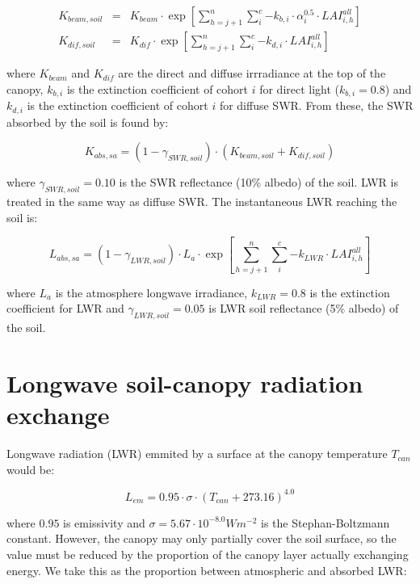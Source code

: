 \documentclass[]{book}
\begin{document}
\begin{eqnarray}
K_{beam, soil} &=&  K_{beam} \cdot \exp\left[ \sum_{h=j+1}^{n}{\sum_{i}^{c}{-k_{b,i}\cdot \alpha_i^{0.5} \cdot LAI^{all}_{i,h}}}\right]\\
K_{dif, soil} &=& K_{dif} \cdot \exp\left[ \sum_{h=j+1}^{n}{\sum_{i}^{c}{-k_{d,i}\cdot LAI^{all}_{i,h}}}\right]
\end{eqnarray}

where \(K_{beam}\) and \(K_{dif}\) are the direct and diffuse
irrradiance at the top of the canopy, \(k_{b,i}\) is the extinction
coefficient of cohort \(i\) for direct light (\(k_{b,i} = 0.8\)) and
\(k_{d,i}\) is the extinction coefficient of cohort \(i\) for diffuse
SWR. From these, the SWR absorbed by the soil is found by:

\begin{equation}
K_{abs,sa} = (1 - \gamma_{SWR, soil})\cdot (K_{beam, soil} + K_{dif, soil})
\end{equation}

where \(\gamma_{SWR, soil} = 0.10\) is the SWR reflectance (10\% albedo)
of the soil. LWR is treated in the same way as diffuse SWR. The
instantaneous LWR reaching the soil is:

\begin{equation}
L_{abs,sa} = (1 - \gamma_{LWR, soil})\cdot L_{a} \cdot \exp\left[ \sum_{h=j+1}^{n}{\sum_{i}^{c}{-k_{LWR}\cdot LAI^{all}_{i,h}}}\right]
\end{equation}

where \(L_a\) is the atmosphere longwave irradiance, \(k_{LWR} = 0.8\)
is the extinction coefficient for LWR and \(\gamma_{LWR, soil} = 0.05\)
is LWR soil reflectance (5\% albedo) of the soil.

\section{Longwave soil-canopy radiation
exchange}\label{longwave-soil-canopy-radiation-exchange}

Longwave radiation (LWR) emmited by a surface at the canopy temperature
\(T_{can}\) would be:

\begin{equation}
L_{em} = 0.95 \cdot \sigma \cdot (T_{can} + 273.16)^{4.0}
\end{equation}

where \(0.95\) is emissivity and
\(\sigma = 5.67 \cdot 10^{-8.0} Wm^{-2}\) is the Stephan-Boltzmann
constant. However, the canopy may only partially cover the soil surface,
so the value must be reduced by the proportion of the canopy layer
actually exchanging energy. We take this as the proportion between
atmospheric and absorbed LWR:
\end{document}
